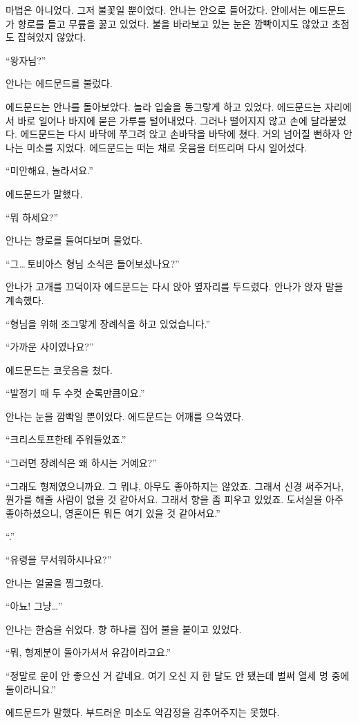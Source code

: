 마법은 아니었다. 그저 불꽃일 뿐이었다. 안나는 안으로 들어갔다. 안에서는 에드문드가 향로를 들고 무릎을 꿇고 있었다. 불을 바라보고 있는 눈은 깜빡이지도 않았고 초점도 잡혀있지 않았다.

`` 왕자님?''

안나는 에드문드를 불렀다.

에드문드는 안나를 돌아보았다. 놀라 입술을 동그랗게 하고 있었다. 에드문드는 자리에서 바로 일어나 바지에 묻은 가루를 털어내었다. 그러나 떨어지지 않고 손에 달라붙었다. 에드문드는 다시 바닥에 쭈그려 앉고 손바닥을 바닥에 쳤다. 거의 넘어질 뻔하자 안나는 미소를 지었다. 에드문드는 떠는 채로 웃음을 터뜨리며 다시 일어섰다.

``미안해요, 놀라서요.''

에드문드가 말했다.

``뭐 하세요?''

안나는 향로를 들여다보며 물었다.

``그\ldots\,토비아스 형님 소식은 들어보셨나요?''

안나가 고개를 끄덕이자 에드문드는 다시 앉아 옆자리를 두드렸다. 안나가 앉자 말을 계속했다.

``형님을 위해 조그맣게 장례식을 하고 있었습니다.''

``가까운 사이였나요?''

에드문드는 코웃음을 쳤다.

``발정기 때 두 수컷 순록만큼이요.''

안나는 눈을 깜빡일 뿐이었다. 에드문드는 어깨를 으쓱였다.

``크리스토프한테 주워들었죠.''

``그러면 장례식은 왜 하시는 거예요?''

``그래도 형제였으니까요. 그 뭐냐, 아무도 좋아하지는 않았죠. 그래서 신경 써주거나, 뭔가를 해줄 사람이 없을 것 같아서요. 그래서 향을 좀 피우고 있었죠. 도서실을 아주 좋아하셨으니, 영혼이든 뭐든 여기 있을 것 같아서요.''

``.''

``유령을 무서워하시나요?''

안나는 얼굴을 찡그렸다.

``아뇨! 그냥\ldots''

안나는 한숨을 쉬었다. 향 하나를 집어 불을 붙이고 있었다.

``뭐, 형제분이 돌아가셔서 유감이라고요.''

``정말로 운이 안 좋으신 거 같네요. 여기 오신 지 한 달도 안 됐는데 벌써 열세 명 중에 둘이라니요.''

에드문드가 말했다. 부드러운 미소도 악감정을 감추어주지는 못했다.

